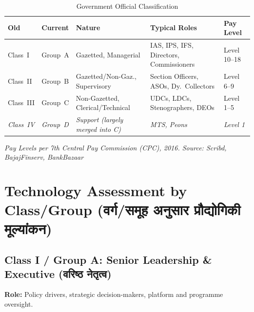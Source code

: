 \documentclass[12pt,a4paper]{article}
\newcommand{\hindi}[1]{{\hindifont #1}}
\begin{document}
\begin{table}[H]
\centering
\caption{Government Official Classification}
\label{tab:classification}
\begin{tabular}{@{}lllp{4.5cm}l@{}}
\toprule
\textbf{Old} & \textbf{Current} & \textbf{Nature} & \textbf{Typical Roles} & \textbf{Pay Level} \\
\midrule
Class~I & Group~A & Gazetted, Managerial & IAS, IPS, IFS, Directors, Commissioners & Level 10--18 \\
Class~II & Group~B & Gazetted/Non-Gaz., Supervisory & Section Officers, ASOs, Dy.\ Collectors & Level 6--9 \\
Class~III & Group~C & Non-Gazetted, Clerical/Technical & UDCs, LDCs, Stenographers, DEOs & Level 1--5 \\
\emph{Class~IV} & \emph{Group~D} & \emph{Support (largely merged into C)} & \emph{MTS, Peons} & \emph{Level 1} \\
\bottomrule
\end{tabular}
\end{table}

{\footnotesize\textit{Pay Levels per 7th Central Pay Commission (CPC), 2016. Source: Scribd, BajajFinserv, BankBazaar}}

\section{Technology Assessment by Class/Group (\hindi{वर्ग/समूह अनुसार प्रौद्योगिकी मूल्यांकन})}

\subsection{Class I / Group A: Senior Leadership \& Executive (\hindi{वरिष्ठ नेतृत्व})}

\textbf{Role:} Policy drivers, strategic decision-makers, platform and programme oversight.
\end{document}
